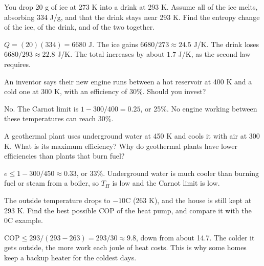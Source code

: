\begin{Exercise}[title={Ice in Your Drink}, label=sl_ice]
You drop 20 g of ice at 273 K into a drink at 293 K. Assume all of the ice melts, absorbing 334 J/g,
and that the drink stays near 293 K. Find the entropy change of the ice, of the drink, and of the two
together.
\end{Exercise}
\begin{Answer}[ref=sl_ice]
$Q = (20)(334) = 6680$ J. The ice gains $6680/273 \approx 24.5$ J/K. The drink loses
$6680/293 \approx 22.8$ J/K. The total increases by about $1.7$ J/K, as the second law requires.
\end{Answer}

\begin{Exercise}[title={An Inventor's Claim}, label=sl_claim]
An inventor says their new engine runs between a hot reservoir at 400 K and a cold one at 300 K, with
an efficiency of 30\%. Should you invest?
\end{Exercise}
\begin{Answer}[ref=sl_claim]
No. The Carnot limit is $1 - 300/400 = 0.25$, or 25\%. No engine working between these temperatures
can reach 30\%.
\end{Answer}

\begin{Exercise}[title={Geothermal Power}, label=sl_geo]
A geothermal plant uses underground water at 450 K and cools it with air at 300 K. What is its maximum
efficiency? Why do geothermal plants have lower efficiencies than plants that burn fuel?
\end{Exercise}
\begin{Answer}[ref=sl_geo]
$e \leq 1 - 300/450 \approx 0.33$, or 33\%. Underground water is much cooler than burning fuel or steam
from a boiler, so $T_H$ is low and the Carnot limit is low.
\end{Answer}

\begin{Exercise}[title={A Cold Snap}, label=sl_cold]
The outside temperature drops to $-10$\textdegree C (263 K), and the house is still kept at 293 K.
Find the best possible COP of the heat pump, and compare it with the 0\textdegree C example.
\end{Exercise}
\begin{Answer}[ref=sl_cold]
$\text{COP} \leq 293/(293-263) = 293/30 \approx 9.8$, down from about 14.7. The colder it gets outside, the
more work each joule of heat costs. This is why some homes keep a backup heater for the coldest days.
\end{Answer}

